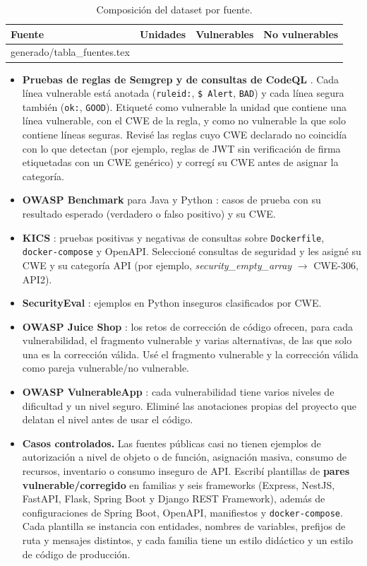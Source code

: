 \documentclass[12pt,a4paper]{article}
\makeatletter
\newcommand{\cod}[1]{\texttt{#1}}
\newcommand{\tabla}[1]{\@@input generado/#1 }
\makeatother
\begin{document}
\begin{table}[H]
\centering\footnotesize
\caption{Composición del dataset por fuente.}
\label{tab:fuentes}
\begin{tabularx}{\textwidth}{@{}Yrrr@{}}
\toprule
\textbf{Fuente} & \textbf{Unidades} & \textbf{Vulnerables} & \textbf{No vulnerables}\\
\midrule
\tabla{tabla_fuentes.tex}
\bottomrule
\end{tabularx}
\end{table}

\begin{itemize}
  \item \textbf{Pruebas de reglas de Semgrep y de consultas de CodeQL} \cite{semgrep,codeql}. Cada línea vulnerable está anotada (\cod{ruleid:}, \cod{\$ Alert}, \cod{BAD}) y cada línea segura también (\cod{ok:}, \cod{GOOD}). Etiqueté como vulnerable la unidad que contiene una línea vulnerable, con el CWE de la regla, y como no vulnerable la que solo contiene líneas seguras. Revisé las reglas cuyo CWE declarado no coincidía con lo que detectan (por ejemplo, reglas de JWT sin verificación de firma etiquetadas con un CWE genérico) y corregí su CWE antes de asignar la categoría.
  \item \textbf{OWASP Benchmark} para Java y Python \cite{benchmark}: casos de prueba con su resultado esperado (verdadero o falso positivo) y su CWE.
  \item \textbf{KICS} \cite{kics}: pruebas positivas y negativas de consultas sobre \cod{Dockerfile}, \cod{docker-compose} y OpenAPI. Seleccioné consultas de seguridad y les asigné su CWE y su categoría API (por ejemplo, \emph{security\_empty\_array} \(\rightarrow\) CWE-306, API2).
  \item \textbf{SecurityEval} \cite{securityeval}: ejemplos en Python inseguros clasificados por CWE.
  \item \textbf{OWASP Juice Shop} \cite{juiceshop}: los retos de corrección de código ofrecen, para cada vulnerabilidad, el fragmento vulnerable y varias alternativas, de las que solo una es la corrección válida. Usé el fragmento vulnerable y la corrección válida como pareja vulnerable/no vulnerable.
  \item \textbf{OWASP VulnerableApp} \cite{vulnerableapp}: cada vulnerabilidad tiene varios niveles de dificultad y un nivel seguro. Eliminé las anotaciones propias del proyecto que delatan el nivel antes de usar el código.
  \item \textbf{Casos controlados.} Las fuentes públicas casi no tienen ejemplos de autorización a nivel de objeto o de función, asignación masiva, consumo de recursos, inventario o consumo inseguro de API. Escribí plantillas de \textbf{pares vulnerable/corregido} en \nFamilias{} familias y seis frameworks (Express, NestJS, FastAPI, Flask, Spring Boot y Django REST Framework), además de configuraciones de Spring Boot, OpenAPI, manifiestos y \cod{docker-compose}. Cada plantilla se instancia con entidades, nombres de variables, prefijos de ruta y mensajes distintos, y cada familia tiene un estilo didáctico y un estilo de código de producción.

\end{itemize}
\end{document}
